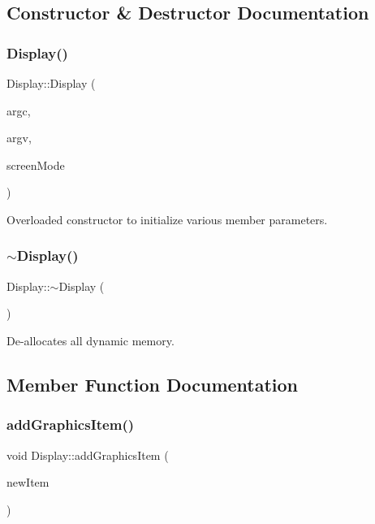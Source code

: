 \subsection{Constructor \& Destructor Documentation}
\hypertarget{classDisplay_a14f0b3465a13c09d9de5b5ed03ca824d}{}\label{classDisplay_a14f0b3465a13c09d9de5b5ed03ca824d} 
\subsubsection{\texorpdfstring{Display()}{Display()}}
{\ttfamily Display\+::\+Display (\begin{DoxyParamCaption}\item[{int}]{argc,  }\item[{char $\ast$$\ast$}]{argv,  }\item[{int}]{screen\+Mode }\end{DoxyParamCaption})}

Overloaded constructor to initialize various member parameters. \hypertarget{classDisplay_ac2607a6bb236c55547a4223d40d85d1f}{}\label{classDisplay_ac2607a6bb236c55547a4223d40d85d1f} 
\subsubsection{\texorpdfstring{$\sim$\+Display()}{~Display()}}
{\ttfamily Display\+::$\sim$\+Display (\begin{DoxyParamCaption}{ }\end{DoxyParamCaption})}

De-\/allocates all dynamic memory. 

\subsection{Member Function Documentation}
\hypertarget{classDisplay_a2374289dfe325db9f908499f7907528a}{}\label{classDisplay_a2374289dfe325db9f908499f7907528a} 
\subsubsection{\texorpdfstring{add\+Graphics\+Item()}{addGraphicsItem()}}
{\ttfamily void Display\+::add\+Graphics\+Item (\begin{DoxyParamCaption}\item[{\hyperlink{classGraphicsItem}{Graphics\+Item} $\ast$const}]{new\+Item }\end{DoxyParamCaption})}

